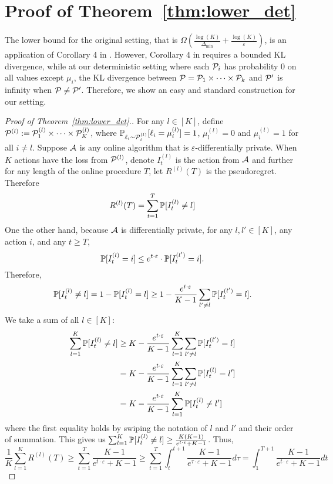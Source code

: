 \section{Proof of Theorem~\ref{thm:lower_det}}
\label{sec:app_lower_bound}
The lower bound for the original setting, that is $\Omega\left(\frac{\log(K)}{\Delta_{\min}} + \frac{\log(K)}{\varepsilon}\right)$, is an application of Corollary 4 in \citet{acharya2021differentially}.
However, Corollary 4 in \citet{acharya2021differentially} requires a bounded KL divergence, while at our deterministic setting where each $\mathcal{P}_i$ has probability $0$ on all values except $\mu_i$, the KL divergence between $\mathcal{P}=\mathcal{P}_1\times\cdots\times\mathcal{P}_k$ and $\mathcal{P}'$ is infinity when $\mathcal{P}\neq \mathcal{P}'$.
Therefore, we show an easy and standard construction for our setting.
\begin{proof}[Proof of Theorem~\ref{thm:lower_det}.]
	For any $l\in [K]$, define $\mathcal{P}^{(l)} := \mathcal{P}^{(l)}_1\times\cdots\times\mathcal{P}^{(l)}_K$, where $\mathbb{P}_{\ell_i\sim\mathcal{P}_i^{(l)}}[\ell_i=\mu_i^{(l)}]=1$, $\mu_l^{(l)} = 0$ and $\mu_i^{(l)}=1$ for all $i\neq l$.
	Suppose $\mathcal{A}$ is any online algorithm that is $\varepsilon$-differentially private. When $K$ actions have the loss from $\mathcal{P}^{(l)}$, denote $I_t^{(l)}$ is the action from $\mathcal{A}$ and further for any length of the online procedure $T$, let $R^{(l)}(T)$ is the pseudoregret.
	Therefore 
	$$
	R^{(l)}(T) = \sum_{t=1}^T\mathbb{P}[I_t^{(l)}\neq l]
	$$
	One the other hand, because $\mathcal{A}$ is differentially private, for any $l,l'\in [K]$, any action $i$, and any $t\geq T$,
	$$
	\mathbb{P}[I_t^{(l)} = i]\leq e^{t\cdot \varepsilon}\cdot \mathbb{P}[I_t^{(l')} = i].
	$$
	Therefore, 
	$$
	\mathbb{P}[I_t^{(l)}\neq l] = 1 - \mathbb{P}[I_t^{(l)}= l] \geq 1 - \frac{e^{t\cdot \varepsilon}}{K-1}\sum_{l'\neq l}\mathbb{P}[I_t^{(l')}= l].
	$$
	We take a sum of all $l\in [K]$:
	\begin{align*}
		\sum_{l=1}^K\mathbb{P}[I_t^{(l)}\neq l] &\geq K - \frac{e^{t\cdot \varepsilon}}{K-1}\sum_{l=1}^K\sum_{l'\neq l}\mathbb{P}[I_t^{(l')}= l] \\
		&= K - \frac{e^{t\cdot \varepsilon}}{K-1}\sum_{l=1}^K\sum_{l'\neq l}\mathbb{P}[I_t^{(l)}= l'] \\
		&= K - \frac{e^{t\cdot \varepsilon}}{K-1}\sum_{l=1}^K\mathbb{P}[I_t^{(l)}\neq l'] 
	\end{align*}
	where the first equality holds by swiping the notation of $l$ and $l'$ and their order of summation.
	This gives us $\sum_{l=1}^K\mathbb{P}[I_t^{(l)}\neq l] \geq \frac{K (K-1)}{e^{t\cdot \varepsilon} + K-1}$.
	Thus, 
	$$
	\frac{1}{K}\sum_{l=1}^KR^{(l)}(T)\geq \sum_{t=1}^T\frac{K-1}{e^{t\cdot \varepsilon} + K-1}\geq \sum_{t=1}^T\int_{t}^{t+1}\frac{K-1}{e^{\tau\cdot \varepsilon} + K-1}d\tau = \int_{1}^{T+1}\frac{K-1}{e^{t\cdot \varepsilon} + K-1}dt
$$
\end{proof}

